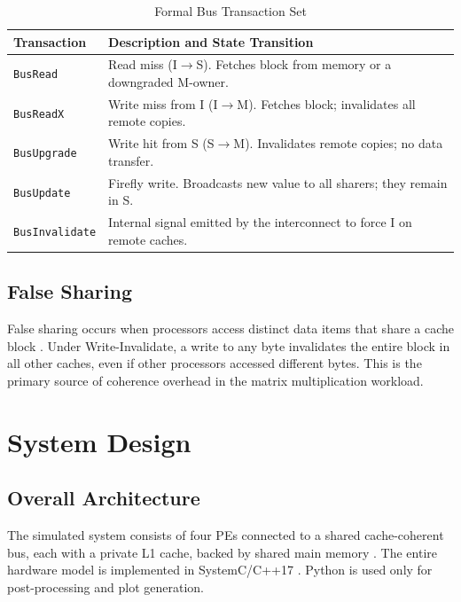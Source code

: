 \documentclass[journal,trans]{IEEEtran}
\begin{document}
\begin{table}[htbp]
\caption{Formal Bus Transaction Set}
\label{tab:transactions}
\renewcommand{\arraystretch}{1.2}
\begin{tabularx}{\columnwidth}{lX}
\toprule
\textbf{Transaction} & \textbf{Description and State Transition} \\
\midrule
\texttt{BusRead}
  & Read miss (I$\to$S). Fetches block from memory or a downgraded M-owner. \\
\texttt{BusReadX}
  & Write miss from I (I$\to$M). Fetches block; invalidates all remote copies. \\
\texttt{BusUpgrade}
  & Write hit from S (S$\to$M). Invalidates remote copies; no data transfer. \\
\texttt{BusUpdate}
  & Firefly write. Broadcasts new value to all sharers; they remain in S. \\
\texttt{BusInvalidate}
  & Internal signal emitted by the interconnect to force I on remote caches. \\
\bottomrule
\end{tabularx}
\end{table}
 
\subsection{False Sharing}
 
False sharing occurs when processors access distinct data items that share a
cache block \cite{hennessy2017computer}. Under Write-Invalidate, a write to any
byte invalidates the entire block in all other caches, even if other processors
accessed different bytes. This is the primary source of coherence overhead in
the matrix multiplication workload.
 
\section{System Design}
\label{sec:system}
 
\subsection{Overall Architecture}
 
The simulated system consists of four PEs connected to a shared cache-coherent
bus, each with a private L1 cache, backed by shared main memory
\cite{garcia2026ce4302}. The entire hardware model is implemented in
SystemC/C++17 \cite{ieee2024systemc}. Python is used only for post-processing
and plot generation.
 
\end{document}
